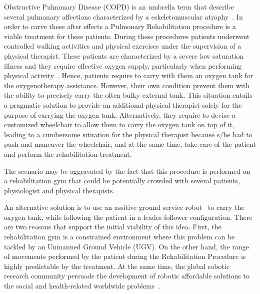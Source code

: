 \documentclass[journal]{IEEEtran}
\begin{document}

 Obstructive Pulmonary Disease (COPD) is an umbrella term that describe several pulmonary affections characterized by a eskeletomuscular atrophy~\cite{Kocsis2016,Wu2012}.  In order to carve these after effects a Pulmonary Rehabilitation procedure is a viable treatment for these patients.  During these procedures patients underwent controlled walking activities and physical exercises under the supervision of a physical therapist.  These patients are characterized by a severe low saturation illness and they require effective oxygen supply, particularly when performing physical activity~\cite{Celli2014}.  Hence, patients require to carry with them an oxygen tank for the oxygenotherapy assistance.  However, their own condition prevent them with the ability to precisely carry the often bulky external tank.  This situation entails a pragmatic solution to provide an additional physical therapist solely for the purpose of carrying the oxygen tank. Alternatively, they require to devise a customized wheelchair to allow them to carry the oxygen tank on top of it, leading to a cumbersome situation for the physical therapist because s/he had to push and maneuver the wheelchair, and at the same time, take care of the patient and perform the rehabilitation treatment.

The scenario may be aggravated by the fact that this procedure is performed on a rehabilitation gym that could be potentially crowded with several patients, physiologist and physical therapists.  

An alternative solution is to use an assitive ground service robot~\cite{Neto2015} to carry the oxygen tank, while following the patient in a leader-follower configuration.  There are two reasons that support the initial viability of this idea.  First,  the rehabilitation gym is a constrained environment where this problem can be tackled by an Unmanned Ground Vehicle (UGV).  On the other hand, the range of movements performed by the patient during the Rehabilitation Procedure is highly predictable by the treatment.  At the same time,  the global robotic research community persuade the development of robotic affordable solutions to the social and health-related worldwide problems~\cite{Khamis2019}.
\end{document}
